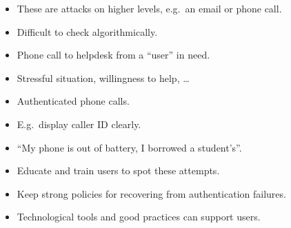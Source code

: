 \begin{frame}
  \begin{remark}
    \begin{itemize}
      \item These are attacks on higher levels, e.g.\ an email or phone call.
      \item Difficult to check algorithmically.
    \end{itemize}
  \end{remark}

  \begin{example}
    \begin{itemize}
      \item Phone call to helpdesk from a \enquote{user} in need.
      \item Stressful situation, willingness to help, \dots
    \end{itemize}
  \end{example}

  \pause{}
  
  \begin{example}[Solution?]
    \begin{itemize}
      \item Authenticated phone calls.
      \item E.g.\ display caller ID clearly.
      \item \enquote{My phone is out of battery, I borrowed a student's}.
    \end{itemize}
  \end{example}
\end{frame}

\begin{frame}
  \begin{solution}
    \begin{itemize}
      \item Educate and train users to spot these attempts.

      \item Keep strong policies for recovering from authentication failures. 

      \item Technological tools and good practices can support users.
    \end{itemize}
  \end{solution}
\end{frame}




\begin{frame}[allowframebreaks]
	\small
  \printbibliography{}
\end{frame}

